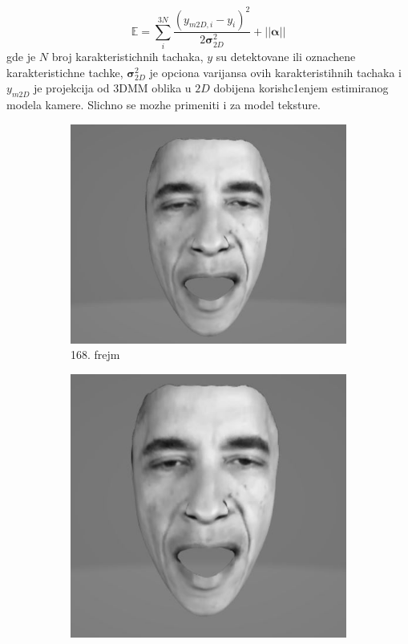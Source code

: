 \documentclass[a4paper, openany, oneside, 11pt]{book}
\begin{document}
\begin{equation}
\mathbb{E} = \sum^{3N}_i \frac{(y_{m2D,i}-y_i)^2}{2\mathbf{\sigma}^2_{2D}}+||\mathbf{\alpha}||
\end{equation}
gde je $N$ broj karakteristichnih tachaka, $y$ su detektovane ili oznachene karakteristichne tachke, $\mathbf{\sigma}^2_{2D}$ je opciona varijansa ovih karakteristihnih tachaka i $y_{m2D}$ je projekcija od \acrshort{3DMM} oblika u $2D$ dobijena korish\-c1enjem estimiranog modela kamere. Slichno se mozhe primeniti i za model teksture.
\begin{figure}[!h]
        \centering
        \begin{subfigure}{0.475\textwidth}
            \centering
            \includegraphics[scale=0.25]{res/168_3D.jpg}
            \caption{168. frejm}
            \label{fig:2_7a}
            \vspace{0pt}
        \end{subfigure}%
        \begin{subfigure}{0.475\textwidth}
            \centering
            \includegraphics[scale=0.25]{res/169_3D.jpg}

\end{subfigure}
\end{figure}
\end{document}
